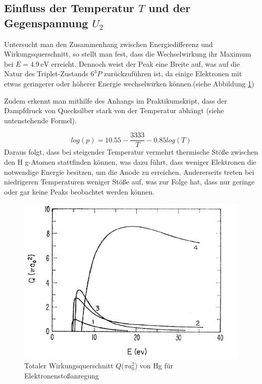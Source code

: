 \documentclass{article}
\begin{document}
\begin{multicols}{2}
\subsection{Einfluss der Temperatur $T$ und der Gegenspannung $U_2$}

Untersucht man den Zusammenhang zwischen Energiedifferenz und Wirkungsquerschnitt, so 
stellt man fest, dass die Wechselwirkung ihr Maximum bei $ E = 4{.}9 \, \mathrm{eV}$ 
erreicht. Dennoch weist der Peak eine Breite auf, was auf die Natur des Triplet-Zustands 
$6^3P$ zurückzuführen ist, da einige Elektronen mit etwas geringerer oder höherer Energie 
wechselwirken können.(siehe Abbildung \ref{Wirkungsquerschnitt})

Zudem erkennt man mithilfe des Anhangs im Praktikumskript, dass der Dampfdruck von 
Quecksilber stark von der Temperatur abhängt (siehe untenstehende Formel).

\begin{equation*}
  log(p) = 10.55 - \frac{3333}{T} - 0.85log(T)
\end{equation*}
Daraus folgt, dass bei steigender Temperatur vermehrt thermische Stöße zwischen den H
g-Atomen stattfinden können, was dazu führt, dass weniger Elektronen die notwendige 
Energie besitzen, um die Anode zu erreichen. Andererseits treten bei niedrigeren 
Temperaturen weniger Stöße auf, was zur Folge hat, dass nur geringe oder gar keine Peaks 
beobachtet werden können.


\begin{figure}[H]
  \centering
  \includegraphics[scale=0.55]{Totaler Wirkungsquerschnitt.png}
  \caption{Totaler Wirkungsquerschnitt $Q(\pi a^2_0$) von Hg für Elektronenstoßanregung}
  \label{Wirkungsquerschnitt}
\end{figure}
\clearpage

\end{multicols}
\end{document}
